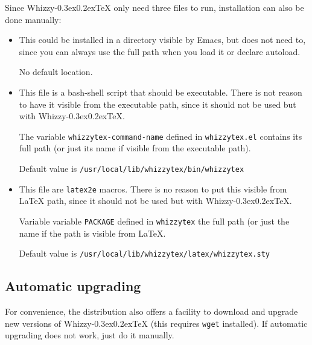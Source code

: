 \documentclass[12pt]{article}
\makeatletter
\let \lst \verb
\def \whizzy {{Whizzy\kern -0.3ex\raise 0.2ex\hbox{\let \@\relax\TeX}}}
\makeatother
\begin{document}
Since {\whizzy} only need three files to run, installation can also be done
manually:
\begin {itemize}

\item[]\hspace{-2em}{\tt whizzytex.el}

This could be installed in a directory visible by Emacs, but does not need
to, since you can always use the full path when you load it or declare
autoload. 

No default location.

\item[]\hspace {-2em}{\tt whizzytex}

This file is a bash-shell script that should be executable.  There is not
reason to have it visible from the executable path, since it should not be
used but with {\whizzy}.

The variable {\tt whizzytex-command-name} defined in {\tt whizzytex.el} 
contains its full path (or just its name if visible from the executable
path). 

Default value is \lst"/usr/local/lib/whizzytex/bin/whizzytex"

\item[]\hspace{-2em}{\tt whizzytex.sty}

This file are {\tt latex2e} macros. There is no reason to put this visible
from {\LaTeX} path, since it should not be used but with {\whizzy}.

Variable variable {\tt PACKAGE} defined in {\tt whizzytex} 
the full path (or just the name if the path is visible from {\LaTeX}. 

Default value is \lst"/usr/local/lib/whizzytex/latex/whizzytex.sty"

\end {itemize}


\subsection {Automatic upgrading}

For convenience, the distribution also offers a facility to download
and upgrade new versions of {\whizzy} (this requires \lst"wget" installed). 
If automatic upgrading does not work, just do it manually.
\end{document}
